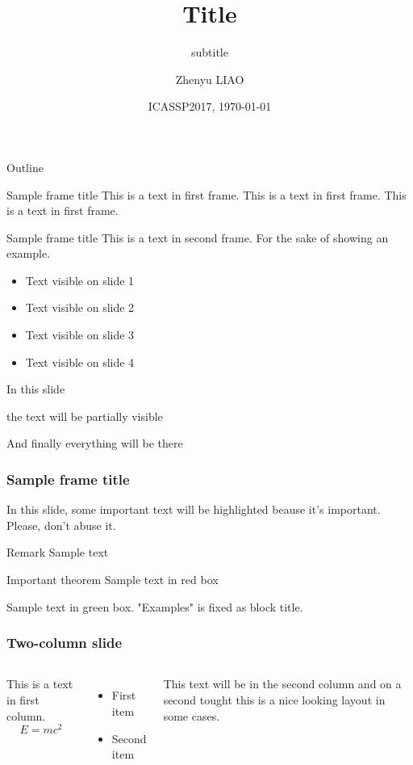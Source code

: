 \documentclass{beamer}
\title[A.b. title]{Title}
\subtitle{subtitle}
\author[Zhenyu LIAO]{Zhenyu LIAO}
\institute[CentraleSup\'elec]{\small CentraleSup\'elec\\ \small Universit\'e Paris-Saclay}
\date[\today]{ICASSP2017, \today}
\begin{document}
\begin{frame}
\titlepage
\end{frame}

\begin{frame}{Outline}
  \tableofcontents
\end{frame}

\begin{frame}{Sample frame title}
This is a text in first frame. This is a text in first frame. This is a text in first frame.
\end{frame}

\begin{frame}{Sample frame title}
This is a text in second frame. 
For the sake of showing an example.
\begin{itemize}
 \item<1-> Text visible on slide 1
 \item<2-> Text visible on slide 2
 \item<3> Text visible on slide 3
 \item<4-> Text visible on slide 4
\end{itemize}
\end{frame}
%
\begin{frame}
 In this slide \pause
 
 the text will be partially visible \pause
 
 And finally everything will be there
\end{frame}

\begin{frame}
\frametitle{Sample frame title}
 
In this slide, some important text will be
\alert{highlighted} beause it's important.
Please, don't abuse it.
 
\begin{block}{Remark}
Sample text
\end{block}

\begin{alertblock}{Important theorem}
Sample text in red box
\end{alertblock}
 
\begin{examples}
Sample text in green box. "Examples" is fixed as block title.
\end{examples}
\end{frame}

\begin{frame}
\frametitle{Two-column slide}
 
\begin{columns}
 
This is a text in first column.
$$E=mc^2$$
\begin{itemize}
\item First item
\item Second item
\end{itemize}
 
This text will be in the second column
and on a second tought this is a nice looking
layout in some cases.
\end{columns}
\end{frame}
\end{document}
